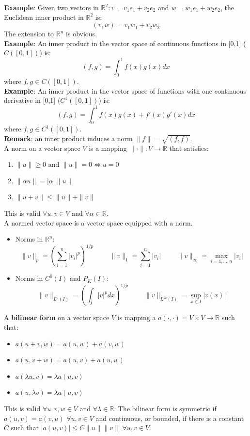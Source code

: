 \textbf{Example}: Given two vectors in $\mathbb{R}^2: v = v_1e_1 + v_2e_2$ and $w = w_1e_1 + w_2e_2$, the Euclidean inner product in $\mathbb{R}^2$ is:
\[
    (v,w) = v_1w_1 + v_2w_2     
\]
The extension to $\mathbb{R}^n$ is obvious.\\

\textbf{Example}: An inner product in the vector space of continuous functions in [0,1] ($C([0,1])$) is:
\[
    (f,g) = \int_0^1 f(x)g(x)dx    
\]
where $f,g \in C([0,1])$.\\

\textbf{Example}: An inner product in the vector space of functions with one continuous derivative in [0,1] ($C^1([0,1])$) is:
\[
    (f,g) = \int_0^1 f(x)g(x) + f'(x)g'(x)dx    
\]
where $f,g \in C^1([0,1])$.\\

\textbf{Remark}: an inner product induces a norm $\|f\| = \sqrt{(f,f)}$.\\

A norm on a vector space $V$ is a mapping $\|\cdot\|: V \to \mathbb{R}$ that satisfies:
\begin{enumerate}
    \item $\|u\| \geq 0$ and $\|u\| = 0 \iff u = 0$
    \item $\|\alpha u\| = |\alpha|\|u\|$
    \item $\|u+v\| \leq \|u\| + \|v\|$
\end{enumerate}
This is valid $\forall u,v \in V $ and $\forall \alpha \in \mathbb{R}$.\\
A normed vector space is a vector space equipped with a norm. 
\begin{itemize}
    \item Norms in $\mathbb{R}^n$:
    \[
        \|v\|_p = \left(\sum_{i=1}^{n} |v_i|^p\right)^{1/p}   \hspace{1cm} \|v\|_1 = \sum_{i=1}^{n} |v_i| \hspace{1cm} \|v\|_\infty = \max_{i=1,\dots,n} |v_i|
    \]
    \item Norms in $C^0(I)$ and $P_K(I)$:
    \[
        \|v\|_{L^p(I)} = \left(\int_I |v|^p dx\right)^{1/p}   \hspace{1cm} \|v\|_{L^{\infty}(I)} = \sup_{x \in I} |v(x)| 
    \]
\end{itemize}

A \textbf{bilinear form} on a vector space $V$ is mapping a $a(\cdot,\cdot) = V \times V \to \mathbb{R}$ such that:
\begin{itemize}
    \item $a(u+v,w) = a(u,w) + a(v,w)$
    \item $a(u,v+w) = a(u,v) + a(u,w)$
    \item $a(\lambda u, v) = \lambda a(u,v)$
    \item $a(u,\lambda v) = \lambda a(u,v)$
\end{itemize}
This is valid $\forall u,v,w \in V$ and $\forall \lambda \in \mathbb{R}$. The bilinear form is symmetric if $a(u,v) = a(v,u)$ $\forall u,v \in V$ and continuous, or bounded, if there is a constant $C$ such that $|a(u,v)| \leq C\|u\|\|v\|$ $\forall u,v \in V$.\\

